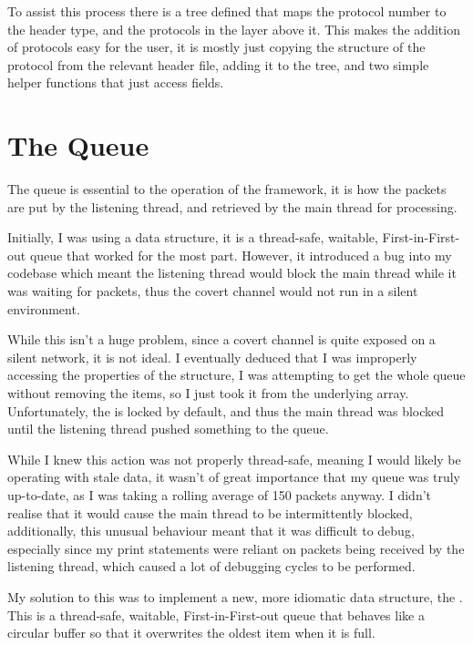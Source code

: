 To assist this process there is a tree defined that maps the protocol number to the header type, and the protocols in the layer above it. This makes the addition of protocols easy for the user, it is mostly just copying the structure of the protocol from the relevant header file, adding it to the tree, and two simple helper functions that just access fields.


\section{The Queue}
\label{sec:queue}

The queue is essential to the operation of the framework, it is how the packets are put by the listening thread, and retrieved by the main thread for processing.

Initially, I was using a  data structure, it is a thread-safe, waitable, First-in-First-out queue \citep{julia} that worked for the most part. However, it introduced a bug into my codebase which meant the listening thread would block the main thread while it was waiting for packets, thus the covert channel would not run in a silent environment.

While this isn't a huge problem, since a covert channel is quite exposed on a silent network, it is not ideal. I eventually deduced that I was improperly accessing the properties of the structure, I was attempting to get the whole queue without removing the items, so I just took it from the underlying array. Unfortunately, the  is locked by default, and thus the main thread was blocked until the listening thread pushed something to the queue.

While I knew this action was not properly thread-safe, meaning I would likely be operating with stale data, it wasn't of great importance that my queue was truly up-to-date, as I was taking a rolling average of 150 packets anyway. I didn't realise that it would cause the main thread to be intermittently blocked, additionally, this unusual behaviour meant that it was difficult to debug, especially since my print statements were reliant on packets being received by the listening thread, which caused a lot of debugging cycles to be performed.

My solution to this was to implement a new, more idiomatic data structure, the . This is a thread-safe, waitable, First-in-First-out queue that behaves like a circular buffer so that it overwrites the oldest item when it is full.

